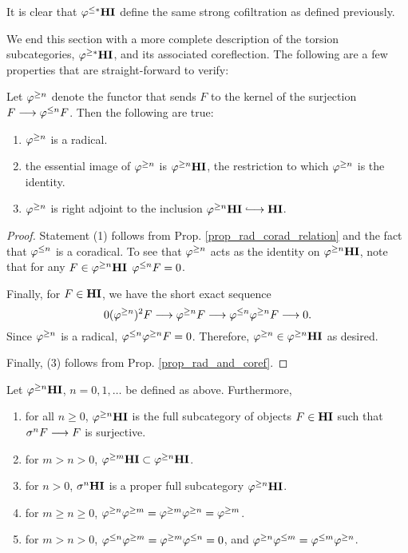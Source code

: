 It is clear that $\varphi^{\leq *}\mathbf{HI}$ define the same strong cofiltration as
defined previously. 

We end this section with a more complete description of the 
torsion subcategories, $\varphi^{\geq *}\mathbf{HI}$, and its associated coreflection. 
The following are a few properties that are straight-forward to
verify:

\begin{prop} 
Let $\varphi^{\geq n}$ denote the functor that sends $F$ to the kernel of
the surjection $F \longrightarrow \varphi^{\leq n}F$. Then the following are true:
\begin{enumerate}
\item $\varphi^{\geq n}$ is a radical.
\tinyskip

\item the essential image of $\varphi^{\geq n}$ is $\varphi^{\geq n}\mathbf{HI}$, the 
restriction to which $\varphi^{\geq n}$ is the identity.
\tinyskip

\item $\varphi^{\geq n}$ is right adjoint to the inclusion $\THI{n} \into 
\HI$.
\tinyskip
\end{enumerate}
\end{prop}
\begin{proof}
Statement (1) follows from Prop. \ref{prop_rad_corad_relation} and
the fact that $\varphi^{\leq n}$ is a coradical. To see that $\varphi^{\geq n}$
acts as the identity on $\varphi^{\geq n}\mathbf{HI}$, note that for any $F \in \varphi^{\geq n}\mathbf{HI}$
$\varphi^{\leq n} F = 0$. 

Finally, for $F \in \mathbf{HI}$, we have the short exact sequence
\[
0 (\varphi^{\geq n})^2 F \longrightarrow \varphi^{\geq n}F \longrightarrow \varphi^{\leq n} \varphi^{\geq n}F \longrightarrow 0.
\]
Since $\varphi^{\geq n}$ is a radical, $\varphi^{\leq n} \varphi^{\geq n}F = 0$. Therefore,
$\varphi^{\geq n} \in \varphi^{\geq n}\mathbf{HI}$ as desired.

Finally, (3) follows from Prop. \ref{prop_rad_and_coref}.
\end{proof}

\begin{prop}\label{prop_THI_properties}
Let $\varphi^{\geq n}\mathbf{HI}$, $n = 0, 1,\dots$ be defined as above. Furthermore,

\begin{enumerate}
\item for all $n \geq 0$, $\varphi^{\geq n}\mathbf{HI}$ is the full subcategory of
objects $F \in \mathbf{HI}$ such that $\sigma^{n}F \longrightarrow F$ is surjective.
\tinyskip

\item for $m > n > 0$, $\varphi^{\geq m}\mathbf{HI} \subset \varphi^{\geq n}\mathbf{HI}$.
\tinyskip

\item for $n > 0$, $\sigma^{n} \mathbf{HI}$ is a proper full subcategory 
$\varphi^{\geq n}\mathbf{HI}$.
\tinyskip

\item for $m \geq n \geq 0$, $\varphi^{\geq n}\varphi^{\geq m} = \varphi^{\geq m}\varphi^{\geq n} =
\varphi^{\geq m}$.
\tinyskip

\item for $m > n > 0$, $\varphi^{\leq n}\varphi^{\geq m} = \varphi^{\geq m}\varphi^{\leq n} = 0$, 
and $\varphi^{\geq n}\varphi^{\leq m} = \varphi^{\leq m}\varphi^{\geq n}$.
\tinyskip

\end{enumerate}
\end{prop}

